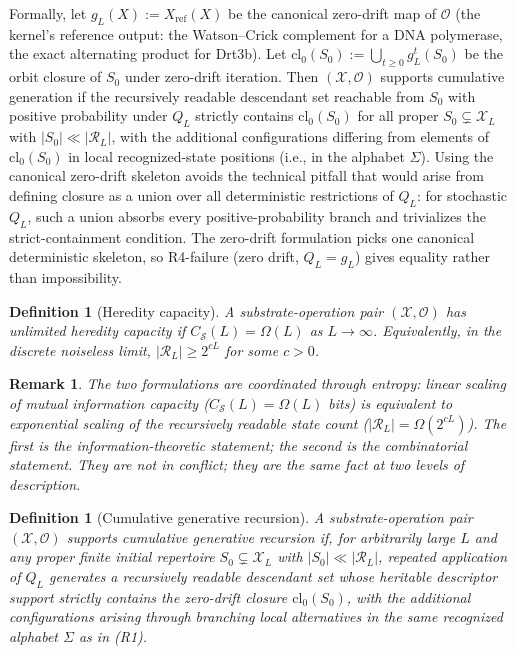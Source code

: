 \documentclass[aps,prx,reprint,amsmath,amssymb,floatfix,superscriptaddress,nofootinbib]{revtex4-2}
\theoremstyle{plain-thm}
\theoremstyle{definition-thm}
\newtheorem{definition}[theorem]{Definition}
\newtheorem{remark}[theorem]{Remark}
\newcommand{\Csub}{C_{\mathcal{S}}}
\newcommand{\Xset}{\mathcal{X}}
\newcommand{\Op}{\mathcal{O}}
\newcommand{\Reach}{\mathcal{R}}
\begin{document}
Formally, let $g_L(X) := X_{\mathrm{ref}}(X)$ be the canonical zero-drift map of $\Op$ (the kernel's reference output: the Watson--Crick complement for a DNA polymerase, the exact alternating product for Drt3b). Let $\mathrm{cl}_0(S_0) := \bigcup_{t \ge 0} g_L^t(S_0)$ be the orbit closure of $S_0$ under zero-drift iteration. Then $(\Xset, \Op)$ supports cumulative generation if the recursively readable descendant set reachable from $S_0$ with positive probability under $Q_L$ strictly contains $\mathrm{cl}_0(S_0)$ for all proper $S_0 \subsetneq \Xset_L$ with $|S_0| \ll |\Reach_L|$, with the additional configurations differing from elements of $\mathrm{cl}_0(S_0)$ in local recognized-state positions (i.e., in the alphabet $\Sigma$). Using the canonical zero-drift skeleton avoids the technical pitfall that would arise from defining closure as a union over all deterministic restrictions of $Q_L$: for stochastic $Q_L$, such a union absorbs every positive-probability branch and trivializes the strict-containment condition. The zero-drift formulation picks one canonical deterministic skeleton, so R4-failure (zero drift, $Q_L = g_L$) gives equality rather than impossibility.

\begin{definition}[Heredity capacity]
\label{def:capacity}
A substrate-operation pair $(\Xset, \Op)$ has \textnormal{unlimited heredity capacity} if $\Csub(L) = \Omega(L)$ as $L \to \infty$. Equivalently, in the discrete noiseless limit, $|\Reach_L| \ge 2^{cL}$ for some $c > 0$.
\end{definition}

\begin{remark}
The two formulations are coordinated through entropy: linear scaling of mutual information capacity ($\Csub(L) = \Omega(L)$ bits) is equivalent to exponential scaling of the recursively readable state count ($|\Reach_L| = \Omega(2^{cL})$). The first is the information-theoretic statement; the second is the combinatorial statement. They are not in conflict; they are the same fact at two levels of description.
\end{remark}

\begin{definition}[Cumulative generative recursion]
\label{def:generation}
A substrate-operation pair $(\Xset, \Op)$ supports \textnormal{cumulative generative recursion} if, for arbitrarily large $L$ and any proper finite initial repertoire $S_0 \subsetneq \Xset_L$ with $|S_0| \ll |\Reach_L|$, repeated application of $Q_L$ generates a recursively readable descendant set whose heritable descriptor support strictly contains the zero-drift closure $\mathrm{cl}_0(S_0)$, with the additional configurations arising through branching local alternatives in the same recognized alphabet $\Sigma$ as in (R1).
\end{definition}
\end{document}
